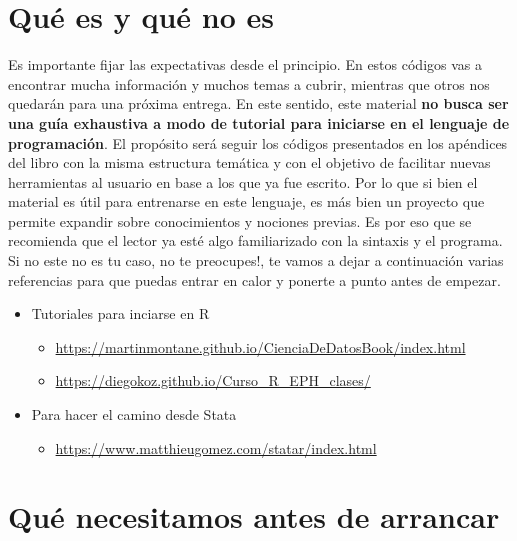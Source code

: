 \documentclass[
]{book}
\providecommand{\tightlist}{%
  \setlength{\itemsep}{0pt}\setlength{\parskip}{0pt}}
\begin{document}
\hypertarget{quuxe9-es-y-quuxe9-no-es}{%
\section*{Qué es y qué no es}\label{quuxe9-es-y-quuxe9-no-es}}

Es importante fijar las expectativas desde el principio. En estos códigos vas a encontrar mucha información y muchos temas a cubrir, mientras que otros nos quedarán para una próxima entrega. En este sentido, este material \textbf{no busca ser una guía exhaustiva a modo de tutorial para iniciarse en el lenguaje de programación}. El propósito será seguir los códigos presentados en los apéndices del libro con la misma estructura temática y con el objetivo de facilitar nuevas herramientas al usuario en base a los que ya fue escrito. Por lo que si bien el material es útil para entrenarse en este lenguaje, es más bien un proyecto que permite expandir sobre conocimientos y nociones previas. Es por eso que se recomienda que el lector ya esté algo familiarizado con la sintaxis y el programa. Si no este no es tu caso, no te preocupes!, te vamos a dejar a continuación varias referencias para que puedas entrar en calor y ponerte a punto antes de empezar.

\begin{itemize}
\item
  Tutoriales para inciarse en R

  \begin{itemize}
  \item
    \url{https://martinmontane.github.io/CienciaDeDatosBook/index.html}
  \item
    \url{https://diegokoz.github.io/Curso_R_EPH_clases/}
  \end{itemize}
\item
  Para hacer el camino desde Stata

  \begin{itemize}
  \tightlist
  \item
    \url{https://www.matthieugomez.com/statar/index.html}
  \end{itemize}
\end{itemize}

\hypertarget{quuxe9-necesitamos-antes-de-arrancar}{%
\section*{Qué necesitamos antes de arrancar}\label{quuxe9-necesitamos-antes-de-arrancar}}
\end{document}
